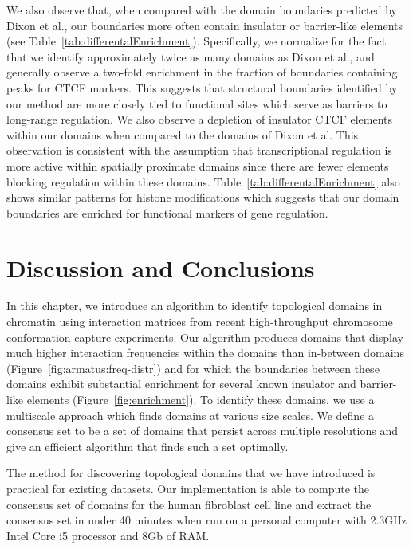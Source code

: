 \documentclass[12pt]{cmuthesis}
\begin{document}
  We also observe that, when compared with the domain boundaries predicted by Dixon et al., our boundaries more often contain insulator or barrier-like elements (see Table~\ref{tab:differentalEnrichment}). Specifically, we normalize for the fact that we identify approximately twice as many domains as Dixon et al., and generally observe a two-fold enrichment in the fraction of boundaries containing
  peaks for CTCF markers. This suggests that structural boundaries identified by our method are more closely tied to functional sites which serve as barriers to long-range regulation. We also observe a depletion of insulator CTCF elements within our domains when compared to the domains of Dixon et al.  This observation is consistent with the assumption that transcriptional regulation is more active within spatially proximate domains since there are fewer elements blocking regulation within these domains.  Table~\ref{tab:differentalEnrichment} also shows similar patterns for histone modifications which suggests that our domain boundaries are enriched for functional markers of gene regulation.

\section{Discussion and Conclusions}

  In this chapter, we introduce an algorithm to identify topological domains in chromatin using interaction matrices from recent high-throughput chromosome conformation capture experiments.  Our algorithm produces domains that display much higher interaction frequencies within the domains than in-between domains (Figure~\ref{fig:armatus:freq-distr}) and for which the boundaries between these domains exhibit substantial enrichment for several known insulator and barrier-like elements (Figure~\ref{fig:enrichment}).  To identify these domains, we use a multiscale approach which finds domains at various size scales.  %
  We define a consensus set to be a set of domains that persist across multiple resolutions and give an efficient algorithm that finds such a set optimally.

  The method for discovering topological domains that we have introduced is practical for existing datasets.  Our implementation is able to compute the consensus set of domains for the human fibroblast cell line and extract the consensus set in under 40 minutes when run on a personal computer with 2.3GHz Intel Core i5 processor and 8Gb of RAM.
\end{document}
